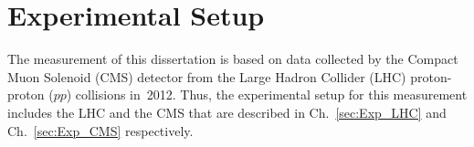 \chapter{Experimental Setup} %
\label{sec:Exp}

The measurement of this dissertation is based on data collected by the Compact Muon Solenoid (CMS) detector from the Large Hadron Collider (LHC) proton-proton ($pp$) collisions in~2012. Thus, the experimental setup for this measurement includes the LHC and the CMS that are described in Ch.~\ref{sec:Exp_LHC} and Ch.~\ref{sec:Exp_CMS} respectively. 

